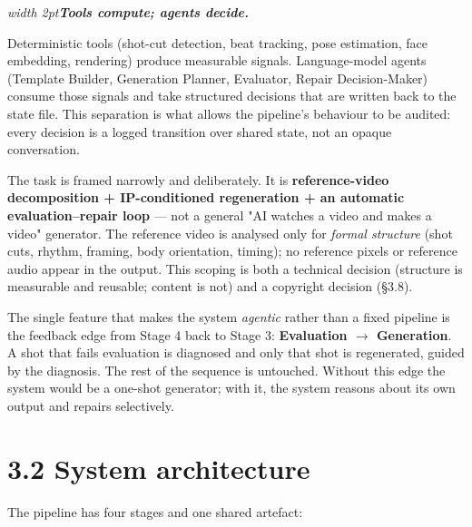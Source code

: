 \documentclass[10pt,twocolumn,letterpaper]{article}
\newenvironment{quotebox}%
 {\par\vspace{3pt}\noindent\begin{list}{}{\setlength{\leftmargin}{1em}\setlength{\rightmargin}{0.5em}}\item\footnotesize\itshape\color{black!80}\hspace*{-0.6em}\vrule width 2pt\hspace{0.6em}\ignorespaces}%
 {\end{list}\vspace{3pt}}
\begin{document}
\begin{quotebox}\textbf{Tools compute; agents decide.}\end{quotebox}

Deterministic tools (shot-cut detection, beat tracking, pose estimation, face embedding, rendering) produce measurable signals. Language-model agents (Template Builder, Generation Planner, Evaluator, Repair Decision-Maker) consume those signals and take structured decisions that are written back to the state file. This separation is what allows the pipeline's behaviour to be audited: every decision is a logged transition over shared state, not an opaque conversation.

The task is framed narrowly and deliberately. It is \textbf{reference-video decomposition + IP-conditioned regeneration + an automatic evaluation--repair loop} --- not a general "AI watches a video and makes a video" generator. The reference video is analysed only for \emph{formal structure} (shot cuts, rhythm, framing, body orientation, timing); no reference pixels or reference audio appear in the output. This scoping is both a technical decision (structure is measurable and reusable; content is not) and a copyright decision (\S{}3.8).

The single feature that makes the system \emph{agentic} rather than a fixed pipeline is the feedback edge from Stage 4 back to Stage 3: \textbf{Evaluation $\rightarrow$ Generation}. A shot that fails evaluation is diagnosed and only that shot is regenerated, guided by the diagnosis. The rest of the sequence is untouched. Without this edge the system would be a one-shot generator; with it, the system reasons about its own output and repairs selectively.


\section*{3.2 System architecture}

The pipeline has four stages and one shared artefact:
\end{document}
